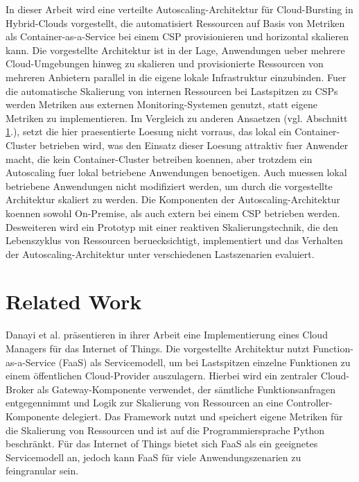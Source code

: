 \documentclass[runningheads]{llncs}
\begin{document}
In dieser Arbeit wird eine verteilte Autoscaling-Architektur für Cloud-Bursting in Hybrid-Clouds vorgestellt, die automatisiert Ressourcen auf Basis von Metriken als Container-as-a-Service bei einem CSP provisionieren und horizontal skalieren kann. Die vorgestellte Architektur ist in der Lage, Anwendungen ueber mehrere Cloud-Umgebungen hinweg zu skalieren und provisionierte Ressourcen von mehreren Anbietern parallel in die eigene lokale Infrastruktur einzubinden. Fuer die automatische Skalierung von internen Ressourcen bei Lastspitzen zu CSPs werden Metriken aus externen Monitoring-Systemen genutzt, statt eigene Metriken zu implementieren. Im Vergleich zu anderen Ansaetzen (vgl. Abschnitt \ref{work}.), setzt die hier praesentierte Loesung nicht vorraus, das lokal ein Container-Cluster betrieben wird, was den Einsatz dieser Loesung attraktiv fuer Anwender macht, die kein Container-Cluster betreiben koennen, aber trotzdem ein Autoscaling fuer lokal betriebene Anwendungen benoetigen. Auch muessen lokal betriebene Anwendungen nicht modifiziert werden, um durch die vorgestellte Architektur skaliert zu werden. Die Komponenten der Autoscaling-Architektur koennen sowohl On-Premise, als auch extern bei einem CSP betrieben werden. \\

Desweiteren wird ein Prototyp mit einer reaktiven Skalierungstechnik, die den Lebenszyklus von Ressourcen beruecksichtigt, implementiert und das Verhalten der Autoscaling-Architektur unter verschiedenen Lastszenarien evaluiert.

	
\section{Related Work} \label{work}
	
Danayi et al. \cite{danayi_opencot_2019} präsentieren in ihrer Arbeit eine Implementierung eines Cloud Managers für das Internet of Things. Die vorgestellte Architektur nutzt Function-as-a-Service (FaaS) als Servicemodell, um bei Lastspitzen einzelne Funktionen zu einem öffentlichen Cloud-Provider auszulagern. Hierbei wird ein zentraler Cloud-Broker als Gateway-Komponente verwendet, der sämtliche Funktionsanfragen entgegennimmt und Logik zur Skalierung von Ressourcen an eine Controller-Komponente delegiert. Das Framework nutzt und speichert eigene Metriken für die Skalierung von Ressourcen und ist auf die Programmiersprache Python beschränkt. Für das Internet of Things bietet sich FaaS als ein geeignetes Servicemodell an, jedoch kann FaaS für viele Anwendungszenarien zu feingranular sein. \\
	
\end{document}
